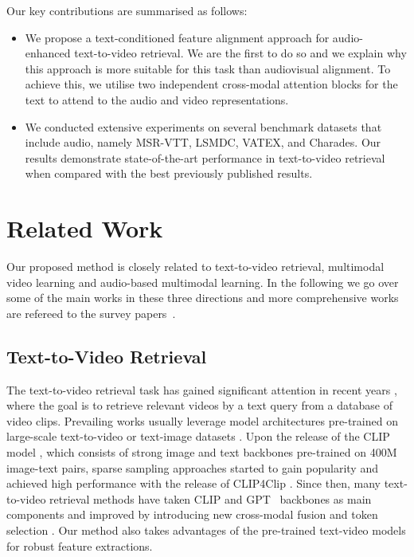 \documentclass[10pt,twocolumn,letterpaper]{article}
\begin{document}
Our key contributions are summarised as follows:
\begin{itemize}
    \item We propose a text-conditioned feature alignment approach for audio-enhanced text-to-video retrieval. We are the first to do so and we explain why this approach is more suitable for this task than audiovisual alignment. To achieve this, we utilise two independent cross-modal attention blocks for the text to attend to the audio and video representations.
    \item  We conducted extensive experiments on several benchmark datasets that include audio, namely MSR-VTT, LSMDC, VATEX, and Charades. Our results demonstrate state-of-the-art performance in text-to-video retrieval when compared with the best previously published results.
\end{itemize} 


\section{Related Work}
Our proposed method is closely related to text-to-video retrieval, multimodal video learning and audio-based multimodal learning. In the following we go over some of the main
works in these three directions and more comprehensive works are refereed to the survey papers~\cite{baltruvsaitis2018multimodal,bayoudh2022survey}. 

\subsection{Text-to-Video Retrieval}
The text-to-video retrieval task has gained significant attention in recent years \cite{Bain21frozen,croitoru2021teachtext,dong2021dual, ging2020coot,hu2022lightweight, lei2021clipbert,liu2022animating,liu2022ts2net,xclip,everythingatonce,wang2021t2vlad,zhang2018cross,zhu2020actbert}, where the goal is to retrieve relevant videos by a text query from a database of video clips. Prevailing works usually leverage model architectures pre-trained on large-scale text-to-video or text-image datasets \cite{Bain21frozen, lei2021clipbert, zhang2018cross, zhu2020actbert}. Upon the release of the CLIP model \cite{clip}, which consists of strong image and text backbones pre-trained on 400M image-text pairs, sparse sampling approaches started to gain popularity and achieved high performance with the release of CLIP4Clip \cite{Luo2022CLIP4ClipAE}. 
Since then, many text-to-video retrieval methods have taken CLIP and GPT~\cite{brown2020language, bridgeformer, alpro, xclip, radford2018improving,radford2019language} backbones as main components and improved by introducing \eg new cross-modal fusion \cite{gorti2022xpool} and token selection \cite{liu2022ts2net}. Our method also takes advantages of the pre-trained text-video models for robust feature extractions. 
\end{document}
